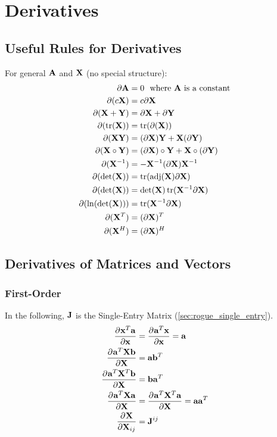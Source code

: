 
\chapter{Derivatives}

\section{Useful Rules for Derivatives}
For general $\mathbf{A}$ and $\mathbf{X}$ (no special structure):
\begin{align}
\partial\mathbf{A}           &= 0~~\textrm{where $\mathbf{A}$ is a constant} \\
\partial(c\mathbf{X})        &= c\partial\mathbf{X}                          \\
\partial(\mathbf{X}+\mathbf{Y})     &= \partial\mathbf{X}+\partial\mathbf{Y}               \\
\partial(\operatorname{tr}(\mathbf{X})) &= \operatorname{tr}(\partial(\mathbf{X}))                 \\
\partial(\mathbf{X}\mathbf{Y})      &= (\partial\mathbf{X})\mathbf{Y} + \mathbf{X}(\partial\mathbf{Y})   \\
\partial(\mathbf{X}\circ\mathbf{Y}) &= (\partial\mathbf{X})\circ\mathbf{Y} + \mathbf{X}\circ(\partial\mathbf{Y}) \\
\partial(\mathbf{X}^{-1})    &= -\mathbf{X}^{-1}(\partial\mathbf{X})\mathbf{X}^{-1}        \\
\partial(\det(\mathbf{X}))   &= \operatorname{tr}(\textrm{adj}(\mathbf{X})\partial\mathbf{X})  \\
\partial(\det(\mathbf{X}))   &= \det(\mathbf{X})\operatorname{tr}(\mathbf{X}^{-1}\partial\mathbf{X})  \\
\partial(\ln(\det(\mathbf{X}))) &= \operatorname{tr}(\mathbf{X}^{-1}\partial\mathbf{X})        \\
\partial(\mathbf{X}^T)       &= (\partial\mathbf{X})^T                       \\
\partial(\mathbf{X}^H)       &= (\partial\mathbf{X})^H
\end{align}

\section{Derivatives of Matrices and Vectors}

\subsection{First-Order}

In the following, $\mathbf{J}$ is the Single-Entry Matrix (\autoref{sec:rogue_single_entry}).
\begin{align}
\pd{\vx^T \va}{\vx}     &= \pd{\va^T \vx}{\vx} = \va          \\
\pd{\va^T\mX\vb}{\mX}   &= \va\vb^T                           \\
\pd{\va^T\mX^T\vb}{\mX} &= \vb\va^T                           \\
\pd{\va^T\mX\va}{\mX}   &= \pd{\va^T\mX^T\va}{\mX} = \va\va^T \\
\pd{\mX}{\mX_{ij}}      &= \mJ^{ij}                              %
\end{align}

